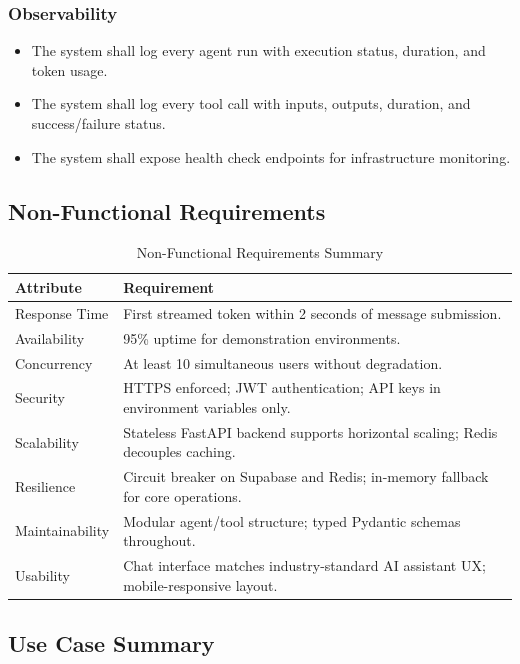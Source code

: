 \documentclass[12pt, a4paper]{article}
\begin{document}
\subsubsection{Observability}
\begin{itemize}[leftmargin=1.5cm, itemsep=0.3em]
  \item The system shall log every agent run with execution status, duration, and token usage.
  \item The system shall log every tool call with inputs, outputs, duration, and success/failure status.
  \item The system shall expose health check endpoints for infrastructure monitoring.
\end{itemize}

\subsection{Non-Functional Requirements}

\begin{table}[H]
\centering
\renewcommand{\arraystretch}{1.35}
\begin{tabularx}{\textwidth}{|l|X|}
  \hline
  \textbf{Attribute} & \textbf{Requirement} \\
  \hline
  Response Time & First streamed token within 2 seconds of message submission. \\
  \hline
  Availability & 95\% uptime for demonstration environments. \\
  \hline
  Concurrency & At least 10 simultaneous users without degradation. \\
  \hline
  Security & HTTPS enforced; JWT authentication; API keys in environment variables only. \\
  \hline
  Scalability & Stateless FastAPI backend supports horizontal scaling; Redis decouples caching. \\
  \hline
  Resilience & Circuit breaker on Supabase and Redis; in-memory fallback for core operations. \\
  \hline
  Maintainability & Modular agent/tool structure; typed Pydantic schemas throughout. \\
  \hline
  Usability & Chat interface matches industry-standard AI assistant UX; mobile-responsive layout. \\
  \hline
\end{tabularx}
\caption{Non-Functional Requirements Summary}
\end{table}

\subsection{Use Case Summary}
\end{document}
